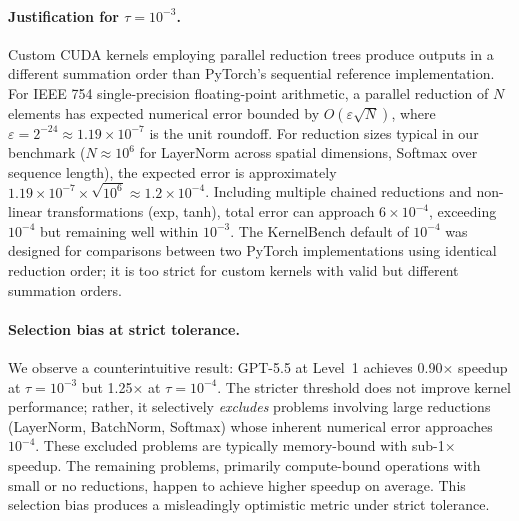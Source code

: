 \documentclass[]{fairmeta}
\begin{document}

\paragraph{Justification for $\tau = 10^{-3}$.}
Custom CUDA kernels employing parallel reduction trees produce outputs in a different summation order than PyTorch's sequential reference implementation. For IEEE 754 single-precision floating-point arithmetic, a parallel reduction of $N$ elements has expected numerical error bounded by $O(\varepsilon\sqrt{N})$, where $\varepsilon = 2^{-24} \approx 1.19 \times 10^{-7}$ is the unit roundoff. For reduction sizes typical in our benchmark ($N \approx 10^6$ for LayerNorm across spatial dimensions, Softmax over sequence length), the expected error is approximately $1.19 \times 10^{-7} \times \sqrt{10^6} \approx 1.2 \times 10^{-4}$. Including multiple chained reductions and non-linear transformations (exp, tanh), total error can approach $6 \times 10^{-4}$, exceeding $10^{-4}$ but remaining well within $10^{-3}$. The KernelBench default of $10^{-4}$ was designed for comparisons between two PyTorch implementations using identical reduction order; it is too strict for custom kernels with valid but different summation orders.

\paragraph{Selection bias at strict tolerance.}
We observe a counterintuitive result: GPT-5.5 at Level~1 achieves 0.90$\times$ speedup at $\tau = 10^{-3}$ but 1.25$\times$ at $\tau = 10^{-4}$. The stricter threshold does not improve kernel performance; rather, it selectively \emph{excludes} problems involving large reductions (LayerNorm, BatchNorm, Softmax) whose inherent numerical error approaches $10^{-4}$. These excluded problems are typically memory-bound with sub-1$\times$ speedup. The remaining problems, primarily compute-bound operations with small or no reductions, happen to achieve higher speedup on average. This selection bias produces a misleadingly optimistic metric under strict tolerance.
\end{document}
